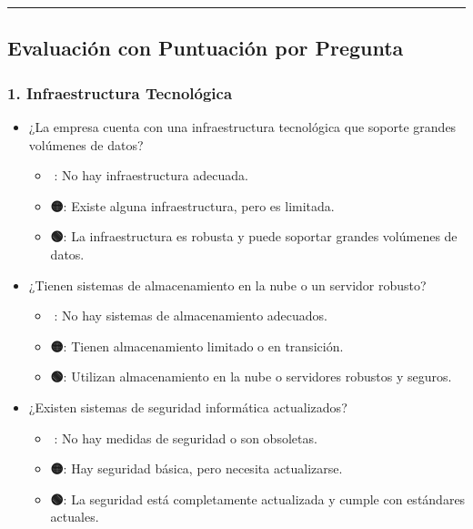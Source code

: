 \documentclass[
  10pt,
  letterpaper,
]{book}
\providecommand{\tightlist}{%
  \setlength{\itemsep}{0pt}\setlength{\parskip}{0pt}}\usepackage{longtable,booktabs,array}
\begin{document}
\begin{center}\rule{0.5\linewidth}{0.5pt}\end{center}

\subsection{Evaluación con Puntuación por
Pregunta}\label{evaluaciuxf3n-con-puntuaciuxf3n-por-pregunta}

\subsubsection{\texorpdfstring{\textbf{1. Infraestructura
Tecnológica}}{1. Infraestructura Tecnológica}}\label{infraestructura-tecnoluxf3gica}

\begin{itemize}
\tightlist
\item
  ¿La empresa cuenta con una infraestructura tecnológica que soporte
  grandes volúmenes de datos?

  \begin{itemize}
  \tightlist
  \item
    \textbf{🔴}: No hay infraestructura adecuada.
  \item
    \textbf{🟡}: Existe alguna infraestructura, pero es limitada.
  \item
    \textbf{🟢}: La infraestructura es robusta y puede soportar grandes
    volúmenes de datos.
  \end{itemize}
\item
  ¿Tienen sistemas de almacenamiento en la nube o un servidor robusto?

  \begin{itemize}
  \tightlist
  \item
    \textbf{🔴}: No hay sistemas de almacenamiento adecuados.
  \item
    \textbf{🟡}: Tienen almacenamiento limitado o en transición.
  \item
    \textbf{🟢}: Utilizan almacenamiento en la nube o servidores
    robustos y seguros.
  \end{itemize}
\item
  ¿Existen sistemas de seguridad informática actualizados?

  \begin{itemize}
  \tightlist
  \item
    \textbf{🔴}: No hay medidas de seguridad o son obsoletas.
  \item
    \textbf{🟡}: Hay seguridad básica, pero necesita actualizarse.
  \item
    \textbf{🟢}: La seguridad está completamente actualizada y cumple
    con estándares actuales.
  \end{itemize}
\end{itemize}
\end{document}
